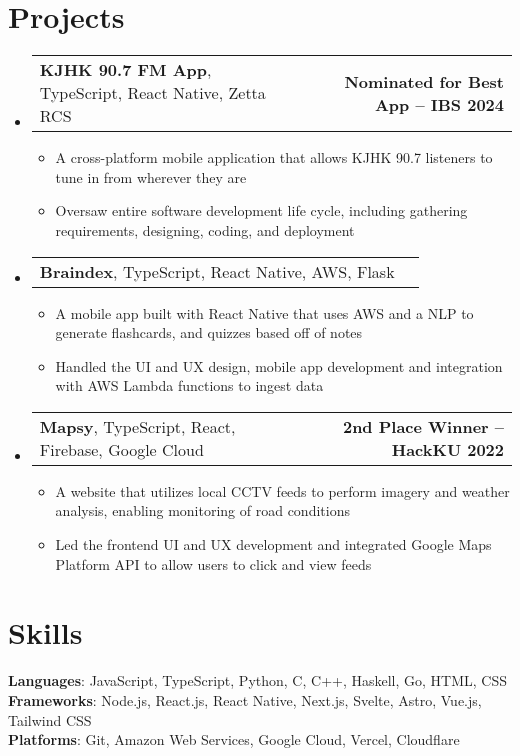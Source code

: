 \documentclass[letter,11pt]{article}
\makeatletter
\newcommand{\resumeItem}[1]{
	\item \small{{#1 \vspace{-2pt}}}
}
\newcommand{\resumeProjectHeading}[2]{
    \item
    \begin{tabular*}{1.001\textwidth}{l@{\extracolsep{\fill}}r}
		\small#1 & \textbf{\small #2}\\
    \end{tabular*}\vspace{-7pt}
}
\newcommand{\resumeSubHeadingListStart}{\begin{itemize}[leftmargin=0.0in, label={}]}
\newcommand{\resumeSubHeadingListEnd}{\end{itemize}}
\newcommand{\resumeItemListStart}{\begin{itemize}[leftmargin=0.5cm]}
\newcommand{\resumeItemListEnd}{\end{itemize}\vspace{-5pt}}
\makeatother
\begin{document}
\section{Projects}
    \vspace{-5pt}
	\resumeSubHeadingListStart
		\resumeProjectHeading{\textbf{KJHK 90.7 FM App}, {TypeScript, React Native, Zetta RCS}}{Nominated for Best App -- IBS 2024}
			\resumeItemListStart
				\resumeItem{A cross-platform mobile application that allows KJHK 90.7 listeners to tune in from wherever they are}
				\resumeItem{Oversaw entire software development life cycle, including gathering requirements, designing, coding, and deployment}
			\resumeItemListEnd
			\vspace{-15pt}
		\resumeProjectHeading{\textbf{Braindex}, {TypeScript, React Native, AWS, Flask}}{}
			\resumeItemListStart
				\resumeItem{A mobile app built with React Native that uses AWS and a NLP to generate flashcards, and quizzes based off of notes}
				\resumeItem{Handled the UI and UX design, mobile app development and integration with AWS Lambda functions to ingest data}
			\resumeItemListEnd
			\vspace{-15pt}
		\resumeProjectHeading{\textbf{Mapsy}, {TypeScript, React, Firebase, Google Cloud}}{2nd Place Winner -- HackKU 2022}
			\resumeItemListStart
				\resumeItem{A website that utilizes local CCTV feeds to perform imagery and weather analysis, enabling monitoring of road conditions}
				\resumeItem{Led the frontend UI and UX development and integrated Google Maps Platform API to allow users to click and view feeds}
			\resumeItemListEnd
	\resumeSubHeadingListEnd
\vspace{-15pt}

\section{Skills}
	\begin{itemize}[leftmargin=0.05in, label={}]
		\small{\item{
			\textbf{Languages}{: JavaScript, TypeScript, Python, C, C++, Haskell, Go, HTML, CSS} \\
			\textbf{Frameworks}{: Node.js, React.js, React Native, Next.js, Svelte, Astro, Vue.js, Tailwind CSS} \\
			\textbf{Platforms}{: Git, Amazon Web Services, Google Cloud, Vercel, Cloudflare}
		}}
	\end{itemize}
\vspace{-15pt}
\end{document}
